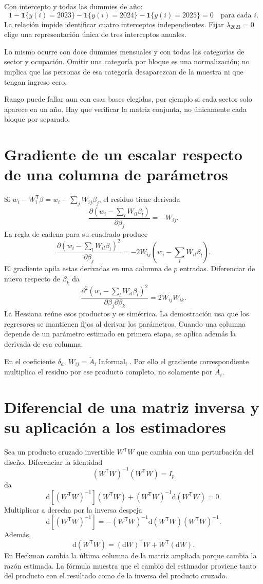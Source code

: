 \documentclass[11pt,a4paper]{article}
\begin{document}
Con intercepto y todas las dummies de año:
\[
1-\mathbf1\{y(i)=2023\}
-\mathbf1\{y(i)=2024\}
-\mathbf1\{y(i)=2025\}=0\quad\text{para cada }i.
\]
La relación impide identificar cuatro interceptos independientes. Fijar $\lambda_{2023}=0$ elige una representación única de tres interceptos anuales.

Lo mismo ocurre con doce dummies mensuales y con todas las categorías de sector y ocupación. Omitir una categoría por bloque es una normalización; no implica que las personas de esa categoría desaparezcan de la muestra ni que tengan ingreso cero.

Rango puede fallar aun con esas bases elegidas, por ejemplo si cada sector solo aparece en un año. Hay que verificar la matriz conjunta, no únicamente cada bloque por separado.

\clearpage
\section{Gradiente de un escalar respecto de una columna de parámetros}

Si $w_i-W_i^{\mathsf T}\beta=w_i-\sum_jW_{ij}\beta_j$, el residuo tiene derivada
\[
\frac{\partial(w_i-\sum_lW_{il}\beta_l)}{\partial\beta_j}
=-W_{ij}.
\]
La regla de cadena para su cuadrado produce
\[
\frac{\partial(w_i-\sum_lW_{il}\beta_l)^2}{\partial\beta_j}
=-2W_{ij}(w_i-\sum_lW_{il}\beta_l).
\]
El gradiente apila estas derivadas en una columna de $p$ entradas. Diferenciar de nuevo respecto de $\beta_k$ da
\[
\frac{\partial^2(w_i-\sum_lW_{il}\beta_l)^2}
{\partial\beta_j\partial\beta_k}=2W_{ij}W_{ik}.
\]
La Hessiana reúne esos productos y es simétrica. La demostración usa que los regresores se mantienen fijos al derivar los parámetros. Cuando una columna depende de un parámetro estimado en primera etapa, se aplica además la derivada de esa columna.

En el coeficiente $\delta_a$, $W_{ij}=\widetilde A_i\operatorname{Informal}_i$. Por ello el gradiente correspondiente multiplica el residuo por ese producto completo, no solamente por $\widetilde A_i$.

\clearpage
\section{Diferencial de una matriz inversa y su aplicación a los estimadores}

Sea un producto cruzado invertible $W^{\mathsf T}W$ que cambia con una perturbación del diseño. Diferenciar la identidad
\[
(W^{\mathsf T}W)^{-1}(W^{\mathsf T}W)=I_p
\]
da
\[
\mathrm d[(W^{\mathsf T}W)^{-1}](W^{\mathsf T}W)
+(W^{\mathsf T}W)^{-1}\mathrm d(W^{\mathsf T}W)=0.
\]
Multiplicar a derecha por la inversa despeja
\[
\mathrm d[(W^{\mathsf T}W)^{-1}]
=-(W^{\mathsf T}W)^{-1}
\mathrm d(W^{\mathsf T}W)(W^{\mathsf T}W)^{-1}.
\]
Además,
\[
\mathrm d(W^{\mathsf T}W)
=(\mathrm dW)^{\mathsf T}W+W^{\mathsf T}(\mathrm dW).
\]
En Heckman cambia la última columna de la matriz ampliada porque cambia la razón estimada. La fórmula muestra que el cambio del estimador proviene tanto del producto con el resultado como de la inversa del producto cruzado.
\end{document}
